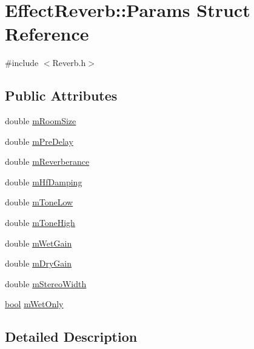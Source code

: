 \hypertarget{struct_effect_reverb_1_1_params}{}\section{Effect\+Reverb\+:\+:Params Struct Reference}
\label{struct_effect_reverb_1_1_params}


{\ttfamily \#include $<$Reverb.\+h$>$}

\subsection*{Public Attributes}
\begin{DoxyCompactItemize}
\item 
double \hyperlink{struct_effect_reverb_1_1_params_a35e1b6bde11b18da2108e41537c39793}{m\+Room\+Size}
\item 
double \hyperlink{struct_effect_reverb_1_1_params_abd817851e80caef37f0ca121917f6169}{m\+Pre\+Delay}
\item 
double \hyperlink{struct_effect_reverb_1_1_params_a6cdc77131f7d1f31d2d69a66c4b1522d}{m\+Reverberance}
\item 
double \hyperlink{struct_effect_reverb_1_1_params_a07756d33110544322adc8c6c37a27df1}{m\+Hf\+Damping}
\item 
double \hyperlink{struct_effect_reverb_1_1_params_a519bad801220d2a5bd580cd65c2f1f49}{m\+Tone\+Low}
\item 
double \hyperlink{struct_effect_reverb_1_1_params_a730ddc43499661170e0f8cdc7af603ca}{m\+Tone\+High}
\item 
double \hyperlink{struct_effect_reverb_1_1_params_adfc1a7a847434c0940894db5b1806f37}{m\+Wet\+Gain}
\item 
double \hyperlink{struct_effect_reverb_1_1_params_abefa3f74bd0707d9618badf84d176d18}{m\+Dry\+Gain}
\item 
double \hyperlink{struct_effect_reverb_1_1_params_a20ec793e1906f32570f3bed500c3f5f5}{m\+Stereo\+Width}
\item 
\hyperlink{mac_2config_2i386_2lib-src_2libsoxr_2soxr-config_8h_abb452686968e48b67397da5f97445f5b}{bool} \hyperlink{struct_effect_reverb_1_1_params_afa871feeebe1ab369c9b7184357be035}{m\+Wet\+Only}
\end{DoxyCompactItemize}


\subsection{Detailed Description}


